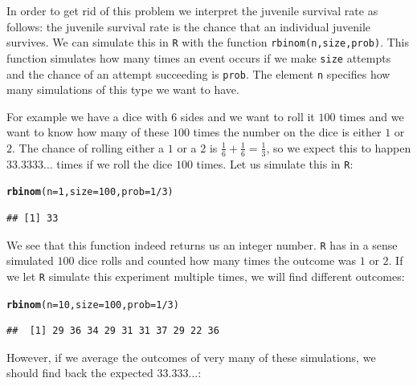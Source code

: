 \documentclass{article}\usepackage[]{graphicx}\usepackage[]{color}
\makeatletter
\newcommand{\hlnum}[1]{\textcolor[rgb]{0.686,0.059,0.569}{#1}}%
\newcommand{\hlopt}[1]{\textcolor[rgb]{0,0,0}{#1}}%
\newcommand{\hlstd}[1]{\textcolor[rgb]{0.345,0.345,0.345}{#1}}%
\newcommand{\hlkwc}[1]{\textcolor[rgb]{0.333,0.667,0.333}{#1}}%
\newcommand{\hlkwd}[1]{\textcolor[rgb]{0.737,0.353,0.396}{\textbf{#1}}}%
\newenvironment{kframe}{%
 \def\at@end@of@kframe{}%
 \ifinner\ifhmode%
  \def\at@end@of@kframe{\end{minipage}}%
  \begin{minipage}{\columnwidth}%
 \fi\fi%
 \def\FrameCommand##1{\hskip\@totalleftmargin \hskip-\fboxsep
 \colorbox{shadecolor}{##1}\hskip-\fboxsep
     \hskip-\linewidth \hskip-\@totalleftmargin \hskip\columnwidth}%
 \MakeFramed {\advance\hsize-\width
   \@totalleftmargin\z@ \linewidth\hsize
   \@setminipage}}%
 {\par\unskip\endMakeFramed%
 \at@end@of@kframe}
\newenvironment{knitrout}{}{} %
\makeatother
\begin{document}
In order to get rid of this problem we interpret the juvenile survival rate as follows: the juvenile survival rate is the chance that an individual juvenile survives. We can simulate this in \texttt{R} with the function \texttt{rbinom(n,size,prob)}. This function simulates how many times an event occurs if we make \texttt{size} attempts and the chance of an attempt succeeding is \texttt{prob}. The element \texttt{n} specifies how many simulations of this type we want to have.

For example we have a dice with 6 sides and we want to roll it $100$ times and we want to know how many of these $100$ times the number on the dice is either $1$ or $2$. The chance of rolling either a $1$ or a $2$ is $\frac{1}{6}+\frac{1}{6}=\frac{1}{3}$, so we expect this to happen $33.3333\dots$ times if we roll the dice $100$ times. Let us simulate this in \texttt{R}:
\begin{knitrout}
\color{fgcolor}\begin{kframe}
\begin{alltt}
\hlkwd{rbinom}\hlstd{(}\hlkwc{n}\hlstd{=}\hlnum{1}\hlstd{,}\hlkwc{size}\hlstd{=}\hlnum{100}\hlstd{,}\hlkwc{prob}\hlstd{=}\hlnum{1}\hlopt{/}\hlnum{3}\hlstd{)}
\end{alltt}
\begin{verbatim}
## [1] 33
\end{verbatim}
\end{kframe}
\end{knitrout}
We see that this function indeed returns us an integer number. \texttt{R} has in a sense simulated $100$ dice rolls and counted how many times the outcome was $1$ or $2$. If we let \texttt{R} simulate this experiment multiple times, we will find different outcomes:
\begin{knitrout}
\color{fgcolor}\begin{kframe}
\begin{alltt}
\hlkwd{rbinom}\hlstd{(}\hlkwc{n}\hlstd{=}\hlnum{10}\hlstd{,}\hlkwc{size}\hlstd{=}\hlnum{100}\hlstd{,}\hlkwc{prob}\hlstd{=}\hlnum{1}\hlopt{/}\hlnum{3}\hlstd{)}
\end{alltt}
\begin{verbatim}
##  [1] 29 36 34 29 31 31 37 29 22 36
\end{verbatim}
\end{kframe}
\end{knitrout}
However, if we average the outcomes of very many of these simulations, we should find back the expected $33.333\dots$:
\end{document}
